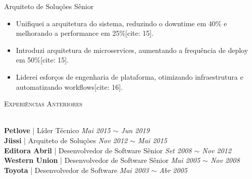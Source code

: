 \documentclass[a4paper]{article}
\newcommand{\lineunder} {
    \vspace*{-8pt} \\
    \hspace*{-18pt} \hrulefill \\
}
\newcommand{\header} [1] {
    \vspace{2mm}
    {\hspace*{-18pt}\vspace*{7pt} \textsc{#1}}
    \vspace*{-6pt} \lineunder
    \vspace{1mm}
}
\begin{document}
Arquiteto de Soluções Sênior \\
\vspace{-2mm}
\begin{itemize}
\setlength\itemsep{-1mm}
    \item Unifiquei a arquitetura do sistema, reduzindo o downtime em 40\% e melhorando a performance em 25\%[cite: 15]. 
\item Introduzi arquitetura de microservices, aumentando a frequência de deploy em 50\%[cite: 15].
    \item Liderei esforços de engenharia de plataforma, otimizando infraestrutura e automatizando workflows[cite: 16]. 
\end{itemize}
\vspace{-2mm}

\header{Experiências Anteriores}
\textbf{Petlove} | Líder Técnico \hfill \textit{Mai 2015 $\sim$ Jun 2019} \\
\textbf{Jüssi} |
Arquiteto de Soluções \hfill \textit{Nov 2012 $\sim$ Mai 2015} \\
\textbf{Editora Abril} |
Desenvolvedor de Software Sênior \hfill \textit{Set 2008 $\sim$ Nov 2012} \\
\textbf{Western Union} |
Desenvolvedor de Software Sênior \hfill \textit{Mai 2005 $\sim$ Nov 2008} \\
\textbf{Toyota} | Desenvolvedor de Software \hfill \textit{Mai 2003 $\sim$ Abr 2005} \\
\end{document}
